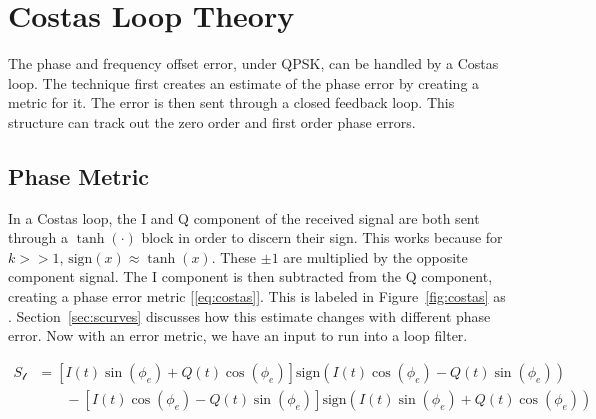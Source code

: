\documentclass[]{article}
\newcommand{\rom}[1]{\uppercase\expandafter{\romannumeral#1}}
\begin{document}
\section{Costas Loop Theory}
\label{sec:costas}
The phase and frequency offset error, under QPSK, can be handled by a Costas loop.  The technique first creates an estimate of the phase error by creating a metric for it.  The error is then sent through a closed feedback loop.  This structure can track out the zero order and first order phase errors. 
\subsection{Phase Metric}
\label{sec:phaseMetric} 
In a Costas loop, the I and Q component of the received signal are both sent through a $\tanh\left(\cdot\right)$ block in order to discern their sign.  This works because for $k>>1$, $\text{sign}\left(x\right) \approx \tanh \left(x\right)$.  These $\pm1$ are multiplied by the opposite component signal.  The I component is then subtracted from the Q component, creating a phase error metric [\ref{eq:costas}].  This is labeled in Figure~\ref{fig:costas} as \rom{1}.  Section~\ref{sec:scurves} discusses how this estimate changes with different phase error.  Now with an error metric, we have an input to run into a loop filter. 

  \begin{align}
  \label{eq:costas}
  S_{\mathcal{l}} &= \left[I\left(t\right)\sin\left(\phi_e\right)+Q\left(t\right)\cos\left(\phi_e\right)\right]\text{sign}\left(I\left(t\right)\cos\left(\phi_e\right)- Q\left(t\right)\sin\left(\phi_e\right)\right)\nonumber \\
  &\qquad {} - \left[I\left(t\right)\cos\left(\phi_e\right)-Q\left(t\right)\sin\left(\phi_e\right)\right]\text{sign}\left(I\left(t\right)\sin\left(\phi_e\right)+Q\left(t\right)\cos\left(\phi_e\right)\right)
  \end{align}
  
\end{document}

